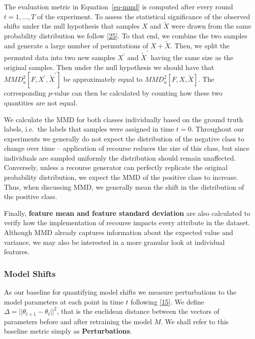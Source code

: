 \documentclass[
  conference]{IEEEtran}
\begin{document}
The evaluation metric in Equation~\ref{eq-mmd} is computed after every
round \(t=1,...,T\) of the experiment. To assess the statistical
significance of the observed shifts under the null hypothesis that
samples \(X\) and \(\tilde{X}\) were drawn from the same probability
distribution we follow
\protect\hyperlink{ref-arcones1992bootstrap}{{[}25{]}}. To that end, we
combine the two samples and generate a large number of permutations of
\(X + \tilde{X}\). Then, we split the permuted data into two new samples
\(X^\prime\) and \(\tilde{X}^\prime\) having the same size as the
original samples. Then under the null hypothesis we should have that
\(MMD_u^2[F,X^\prime,\tilde{X}^\prime]\) be approximately equal to
\(MMD_u^2[F,X,\tilde{X}]\). The corresponding \(p\)-value can then be
calculated by counting how these two quantities are not equal.

We calculate the MMD for both classes individually based on the ground
truth labels, i.e.~the labels that samples were assigned in time
\(t=0\). Throughout our experiments we generally do not expect the
distribution of the negative class to change over time -- application of
recourse reduces the size of this class, but since individuals are
sampled uniformly the distribution should remain unaffected. Conversely,
unless a recourse generator can perfectly replicate the original
probability distribution, we expect the MMD of the positive class to
increase. Thus, when discussing MMD, we generally mean the shift in the
distribution of the positive class.

Finally, \textbf{feature mean and feature standard deviation} are also
calculated to verify how the implementation of recourse impacts every
attribute in the dataset. Although MMD already captures information
about the expected value and variance, we may also be interested in a
more granular look at individual features.

\hypertarget{model-shifts}{%
\subsubsection{Model Shifts}\label{model-shifts}}

As our baseline for quantifying model shifts we measure perturbations to
the model parameters at each point in time \(t\) following
\protect\hyperlink{ref-upadhyay2021towards}{{[}15{]}}. We define
\(\Delta=||\theta_{t+1}-\theta_{t}||^2\), that is the euclidean distance
between the vectors of parameters before and after retraining the model
\(M\). We shall refer to this baseline metric simply as
\textbf{Perturbations}.
\end{document}

